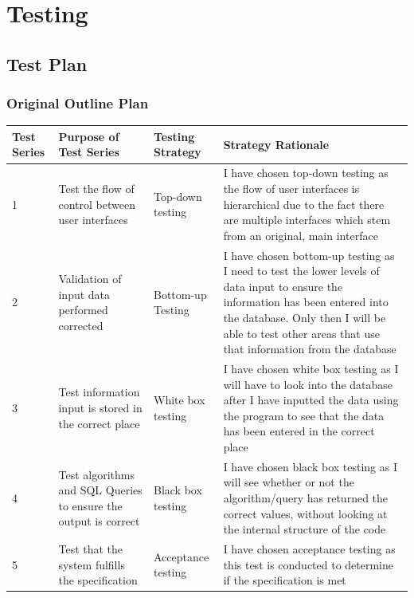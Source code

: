 \chapter{Testing}

\section{Test Plan}

\begin{landscape}
\subsection{Original Outline Plan}

\begin{center}
    \begin{tabular}{|p{2cm}|p{5cm}|p{5cm}|p{4cm}|}
        \hline
        \textbf{Test Series} & \textbf{Purpose of Test Series} & \textbf{Testing Strategy} & \textbf{Strategy Rationale}\\ \hline
1 & Test the flow of control between user interfaces & Top-down testing & I have chosen top-down testing as the flow of user interfaces is hierarchical due to the fact there are multiple interfaces which stem from an original, main interface \\ \hline
2 & Validation of input data performed corrected & Bottom-up Testing & I have chosen bottom-up testing as I need to test the lower levels of data input to ensure the information has been entered into the database. Only then I will be able to test other areas that use that information from the database  \\ \hline
3 & Test information input is stored in the correct place & White box testing & I have chosen white box testing as I will have to look into the database after I have inputted the data using the program to see that the data has been entered in the correct place \\ \hline
4 & Test algorithms and SQL Queries to ensure the output is correct & Black box testing & I have chosen black box testing as I will see whether or not the algorithm/query has returned the correct values, without looking at the internal structure of the code \\ \hline
5 & Test that the system fulfills the specification & Acceptance testing & I have chosen acceptance testing as this test is conducted to determine if the specification is met \\ \hline


    \end{tabular}
\end{center}


\end{landscape}
